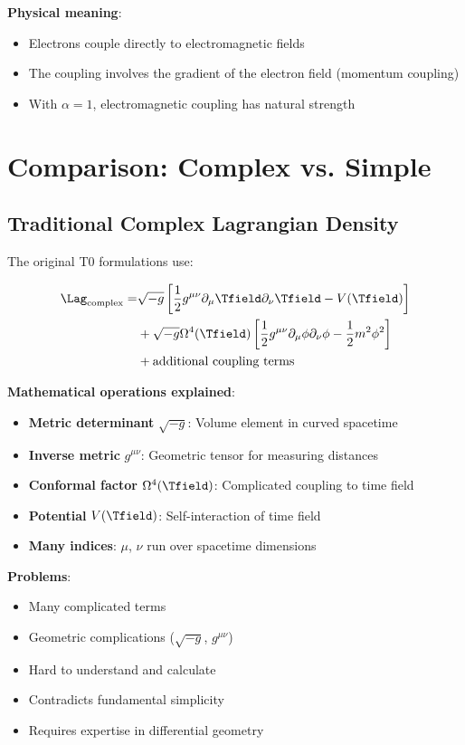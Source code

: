 	\textbf{Physical meaning}:
	\begin{itemize}
		\item Electrons couple directly to electromagnetic fields
		\item The coupling involves the gradient of the electron field (momentum coupling)
		\item With $\alpha = 1$, electromagnetic coupling has natural strength
	\end{itemize}
	
	\section{Comparison: Complex vs. Simple}
	
	\subsection{Traditional Complex Lagrangian Density}
	
	The original T0 formulations use:
	
	\begin{align}
		\Lag_{\text{complex}} = &\sqrt{-g} \left[\frac{1}{2} g^{\mu\nu} \partial_\mu \Tfield \partial_\nu \Tfield - V(\Tfield)\right] \\
		&+ \sqrt{-g} \Omega^4(\Tfield) \left[\frac{1}{2} g^{\mu\nu} \partial_\mu \phi \partial_\nu \phi - \frac{1}{2} m^2 \phi^2\right] \\
		&+ \text{additional coupling terms}
	\end{align}
	
	\textbf{Mathematical operations explained}:
	\begin{itemize}
		\item \textbf{Metric determinant} $\sqrt{-g}$: Volume element in curved spacetime
		\item \textbf{Inverse metric} $g^{\mu\nu}$: Geometric tensor for measuring distances
		\item \textbf{Conformal factor} $\Omega^4(\Tfield)$: Complicated coupling to time field
		\item \textbf{Potential} $V(\Tfield)$: Self-interaction of time field
		\item \textbf{Many indices}: $\mu$, $\nu$ run over spacetime dimensions
	\end{itemize}
	
	\textbf{Problems}:
	\begin{itemize}
		\item Many complicated terms
		\item Geometric complications ($\sqrt{-g}$, $g^{\mu\nu}$)
		\item Hard to understand and calculate
		\item Contradicts fundamental simplicity
		\item Requires expertise in differential geometry
	\end{itemize}
	
